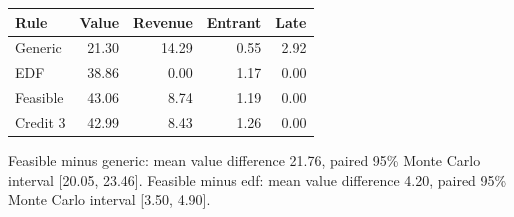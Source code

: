 \begin{center}\small\begin{tabular}{lrrrr}\toprule Rule & Value & Revenue & Entrant & Late\\\midrule
Generic & 21.30 & 14.29 & 0.55 & 2.92\\
EDF & 38.86 & 0.00 & 1.17 & 0.00\\
Feasible & 43.06 & 8.74 & 1.19 & 0.00\\
Credit 3 & 42.99 & 8.43 & 1.26 & 0.00\\
\bottomrule\end{tabular}\end{center}
Feasible minus generic: mean value difference 21.76, paired 95\% Monte Carlo interval [20.05, 23.46].
Feasible minus edf: mean value difference 4.20, paired 95\% Monte Carlo interval [3.50, 4.90].
